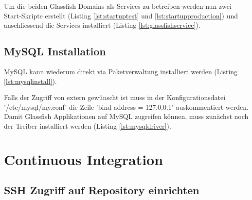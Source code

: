 

Um die beiden Glassfish Domains als Services zu betreiben werden nun zwei Start-Skripte erstellt (Listing \ref{lst:startuptest} und \ref{lst:startupproduction}) und anschliessend die Services installiert (Listing \ref{lst:glassfishservice}).







\subsection{MySQL Installation}

MySQL kann wiederum direkt via Paketverwaltung installiert werden (Listing \ref{lst:mysqlinstall}).



Falls der Zugriff von extern gewünscht ist muss in der Konfigurationsdatei '/etc/mysql/my.conf' die Zeile 'bind-address = 127.0.0.1' auskommentiert werden. Damit Glassfish Applikationen auf MySQL zugreifen können, muss zunächst noch der Treiber installiert werden (Listing \ref{lst:mysqldriver}).



\section{Continuous Integration}


\subsection{SSH Zugriff auf Repository einrichten}


